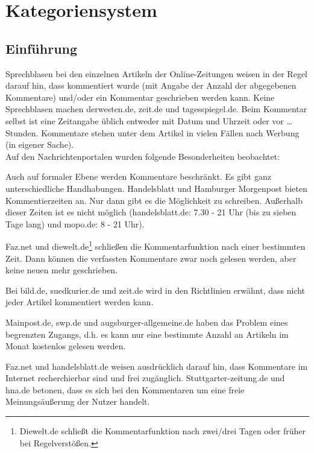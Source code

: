 \chapter{Kategoriensystem}


\section{Einführung}

Sprechblasen bei den einzelnen Artikeln der Online-Zeitungen weisen in der Regel darauf hin, dass kommentiert wurde
(mit Angabe der Anzahl der abgegebenen Kommentare) und/oder ein Kommentar
geschrieben werden kann. Keine Sprechblasen machen derwesten.de, zeit.de und tagesspiegel.de.
Beim Kommentar selbst ist eine Zeitangabe üblich
entweder mit Datum und Uhrzeit oder \glqq vor \ldots Stunden\grqq.  Kommentare
stehen unter dem Artikel in vielen Fällen nach Werbung (in eigener Sache).\\

Auf den Nachrichtenportalen wurden folgende Besonderheiten beobachtet:

Auch auf formaler Ebene werden Kommentare beschränkt. Es gibt ganz
unterschiedliche Handhabungen. Handelsblatt und Hamburger Morgenpost bieten Kommentierzeiten an. 
Nur dann gibt es die Möglichkeit zu schreiben. Außerhalb dieser Zeiten ist es nicht
möglich (handelsblatt.de: 7.30 - 21 Uhr (bis zu sieben Tage lang) und mopo.de: 8 - 21 Uhr).

Faz.net und diewelt.de\footnote{Diewelt.de schließt die Kommentarfunktion nach zwei/drei Tagen oder früher bei
  Regelverstößen.} schließen die Kommentarfunktion nach einer bestimmten
Zeit. Dann können die verfassten Kommentare zwar noch gelesen werden, aber keine
neuen mehr geschrieben. 

Bei  bild.de, suedkurier.de und zeit.de wird in den Richtlinien erwähnt, dass nicht jeder Artikel
kommentiert werden kann.

Mainpost.de, swp.de und augsburger-allgemeine.de haben das Problem eines begrenzten
Zugangs, d.h. es kann nur eine bestimmte Anzahl an Artikeln im Monat kostenlos gelesen werden. 

Faz.net und handelsblatt.de weisen ausdrücklich darauf hin, dass Kommentare im Internet recherchierbar sind und frei zugänglich.
Stuttgarter-zeitung.de und hna.de betonen, dass es sich bei den Kommentaren um eine freie 
Meinungsäußerung der Nutzer handelt. 

